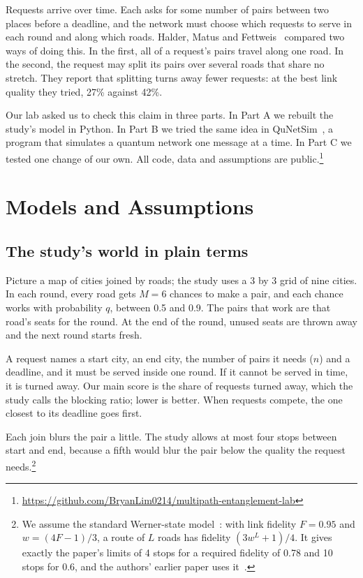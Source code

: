 \documentclass[conference]{IEEEtran}
\begin{document}
Requests arrive over time. Each asks for some number of pairs between two places before a deadline, and the network must choose which requests to serve in each round and along which roads. Halder, Matus and Fettweis~\cite{halder2024} compared two ways of doing this. In the first, all of a request's pairs travel along one road. In the second, the request may split its pairs over several roads that share no stretch. They report that splitting turns away fewer requests: at the best link quality they tried, 27\% against 42\%.

Our lab asked us to check this claim in three parts. In Part A we rebuilt the study's model in Python. In Part B we tried the same idea in QuNetSim~\cite{qunetsim}, a program that simulates a quantum network one message at a time. In Part C we tested one change of our own. All code, data and assumptions are public.\footnote{\url{https://github.com/BryanLim0214/multipath-entanglement-lab}}

\section{Models and Assumptions}
\subsection{The study's world in plain terms}
Picture a map of cities joined by roads; the study uses a 3 by 3 grid of nine cities. In each round, every road gets $M=6$ chances to make a pair, and each chance works with probability $q$, between 0.5 and 0.9. The pairs that work are that road's seats for the round. At the end of the round, unused seats are thrown away and the next round starts fresh.

A request names a start city, an end city, the number of pairs it needs ($n$) and a deadline, and it must be served inside one round. If it cannot be served in time, it is turned away. Our main score is the share of requests turned away, which the study calls the blocking ratio; lower is better. When requests compete, the one closest to its deadline goes first.

Each join blurs the pair a little. The study allows at most four stops between start and end, because a fifth would blur the pair below the quality the request needs.\footnote{We assume the standard Werner-state model~\cite{briegel1998}: with link fidelity $F=0.95$ and $w=(4F-1)/3$, a route of $L$ roads has fidelity $(3w^L+1)/4$. It gives exactly the paper's limits of 4 stops for a required fidelity of 0.78 and 10 stops for 0.6, and the authors' earlier paper uses it~\cite{halder2024sr}.}
\end{document}
